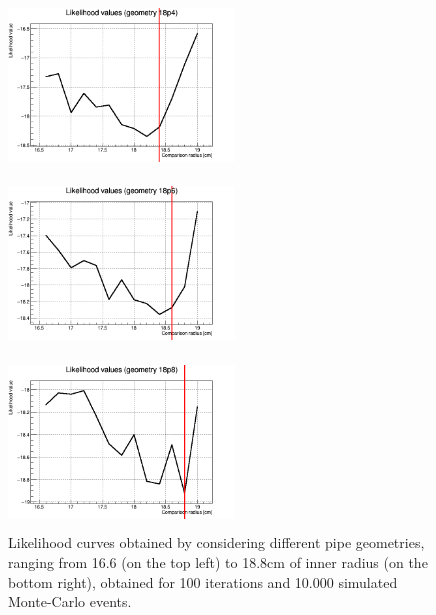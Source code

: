 \documentclass[a4paper, 11pt]{report}
\begin{document}
\begin{figure}[htbp]
\begin{minipage}[b]{.32\textwidth}
\includegraphics[width=6cm, height=4.6cm]{figs/likelihood100LowStat/likelihood18p4.png}
\end{minipage}\hfill
\begin{minipage}[b]{.32\textwidth}
\includegraphics[width=6cm, height=4.6cm]{figs/likelihood100LowStat/likelihood18p6.png}
\end{minipage} \hfill
\begin{minipage}[b]{.32\textwidth}
\includegraphics[width=6cm, height=4.6cm]{figs/likelihood100LowStat/likelihood18p8.png}
\end{minipage} \hfill
\caption{Likelihood curves obtained by considering different pipe geometries, ranging from 16.6 (on the top left) to 18.8cm of inner radius (on the bottom right), obtained for 100 iterations and 10.000 simulated Monte-Carlo events.}
\label{fig:likelihoods}
\end{figure}
\end{document}
